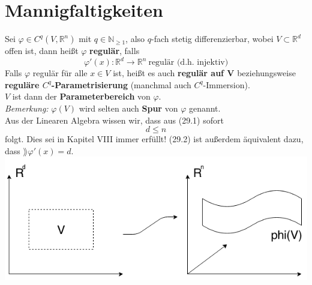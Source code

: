 \section{Mannigfaltigkeiten}
Sei $\varphi\in C^q(V,\mathbb{R}^n)$ mit $q\in\mathbb{N}_{\geq 1}$, 
also $q$-fach stetig differenzierbar, wobei $V\subset\mathbb{R}^d$ offen ist, 
dann heißt $\varphi$ \textbf{regulär}, falls
    \begin{equation}
    \varphi'(x):\mathbb{R}^d\rightarrow\mathbb{R}^n \ \text{regulär (d.h. injektiv)}
    \end{equation}
Falls $\varphi$ regulär für alle $x\in V$ ist, heißt es auch 
\textbf{regulär auf V} beziehungsweise \\
\textbf{reguläre $C^q$-Parametrisierung} (manchmal auch $C^q$-Immersion). \\
$V$ ist dann der \textbf{Parameterbereich} von $\varphi$.\\
\emph{Bemerkung:} $\varphi(V)$ wird selten auch \textbf{Spur} von $\varphi$ genannt.\\
\linebreak
\linebreak
Aus der Linearen Algebra wissen wir, dass aus (29.1) sofort 
    \begin{equation}
    d\leq n
    \end{equation}
folgt. Dies sei in Kapitel VIII immer erfüllt! (29.2) ist außerdem äquivalent dazu, dass 
$\rang \varphi'(x)=d$.\\
    \includegraphics[scale=0.5]{pictures/MA2_0001}

